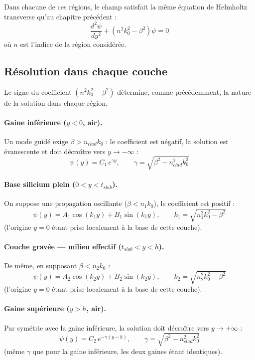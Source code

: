 \documentclass[a4paper,11pt]{report}
\begin{document}
Dans chacune de ces régions, le champ satisfait la même équation de Helmholtz transverse qu'au chapitre précédent :
\begin{equation}
\frac{d^2\psi}{dy^2} + \left(n^2k_0^2-\beta^2\right)\psi = 0
\label{eq:helmholtz_multicouche}
\end{equation}
où $n$ est l'indice de la région considérée.

\subsection*{Résolution dans chaque couche}

Le signe du coefficient $(n^2k_0^2-\beta^2)$ détermine, comme précédemment, la nature de la solution dans chaque région.

\paragraph{Gaine inférieure ($y<0$, air).} Un mode guidé exige $\beta>n_{clad}k_0$ : le coefficient est négatif, la solution est évanescente et doit décroître vers $y\to-\infty$ :
\begin{equation}
\psi(y) = C_1\,e^{\gamma y}, \qquad \gamma = \sqrt{\beta^2-n_{clad}^2k_0^2}
\end{equation}

\paragraph{Base silicium plein ($0<y<t_{slab}$).} On suppose une propagation oscillante ($\beta<n_1k_0$), le coefficient est positif :
\begin{equation}
\psi(y) = A_1\cos(k_1y) + B_1\sin(k_1y), \qquad k_1=\sqrt{n_1^2k_0^2-\beta^2}
\end{equation}
(l'origine $y=0$ étant prise localement à la base de cette couche).

\paragraph{Couche gravée --- milieu effectif ($t_{slab}<y<h$).} De même, en supposant $\beta<n_2k_0$ :
\begin{equation}
\psi(y) = A_2\cos(k_2y) + B_2\sin(k_2y), \qquad k_2=\sqrt{n_2^2k_0^2-\beta^2}
\end{equation}
(l'origine $y=0$ étant prise localement à la base de cette couche).

\paragraph{Gaine supérieure ($y>h$, air).} Par symétrie avec la gaine inférieure, la solution doit décroître vers $y\to+\infty$ :
\begin{equation}
\psi(y) = C_2\,e^{-\gamma(y-h)}, \qquad \gamma = \sqrt{\beta^2-n_{clad}^2k_0^2}
\end{equation}
(même $\gamma$ que pour la gaine inférieure, les deux gaines étant identiques).
\end{document}
